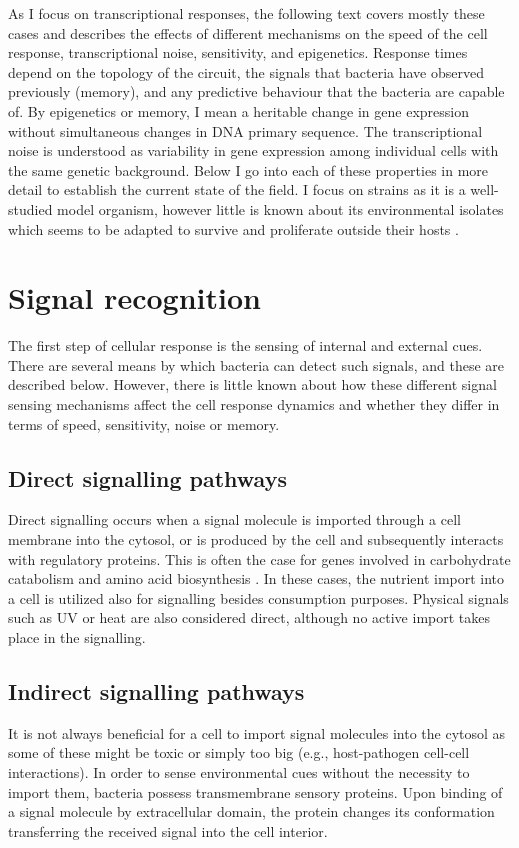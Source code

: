 As I focus on transcriptional responses, the following text covers mostly these cases and describes the effects of different mechanisms on the speed of the cell response, transcriptional noise, sensitivity, and epigenetics.
Response times depend on the topology of the circuit, the signals that bacteria have observed previously (memory), and any predictive behaviour that the bacteria are capable of.
By epigenetics or memory, I mean a heritable change in gene expression without simultaneous changes in DNA primary sequence.
The transcriptional noise is understood as variability in gene expression among individual cells with the same genetic background.
Below I go into each of these properties in more detail to establish the current state of the field.
I focus on  strains as it is a well-studied model organism, however little is known about its environmental isolates which seems to be adapted to survive and proliferate outside their hosts \cite{byappanahalli2004indigenous, ishii2006presence, somorin2016general}.



\section{Signal recognition}
The first step of cellular response is the sensing of internal and external cues.
There are several means by which bacteria can detect such signals, and these are described below.
However, there is little known about how these different signal sensing mechanisms affect the cell response dynamics and whether they differ in terms of speed, sensitivity, noise or memory.

\subsection{Direct signalling pathways}
Direct signalling occurs when a signal molecule is imported through a cell membrane into the cytosol, or is produced by the cell and subsequently interacts with regulatory proteins.
This is often the case for genes involved in carbohydrate catabolism and amino acid biosynthesis \cite{charlier1992arginine, weickert1992isorepressor, pittard1996various, wheatley2013structural}.
In these cases, the nutrient import into a cell is utilized also for signalling besides consumption purposes.
Physical signals such as UV or heat are also considered direct, although no active import takes place in the signalling.

\subsection{Indirect signalling pathways}
It is not always beneficial for a cell to import signal molecules into the cytosol as some of these might be toxic or simply too big (e.g., host-pathogen cell-cell interactions).
In order to sense environmental cues without the necessity to import them, bacteria possess transmembrane sensory proteins.
Upon binding of a signal molecule by extracellular domain, the protein changes its conformation transferring the received signal into the cell interior.

